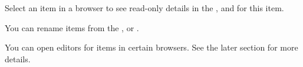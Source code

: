 Select an item in a browser to see read-only details in the \gdpropview{}, \gddatasetsview{} and \gdcompnamesview{} for this item. 

You can rename items from the \gdtestcasebrowser{}, \gdtestsuitebrowser{} or \gdcompnamebrowser{}. 

You can open editors for items in certain browsers. See the later section  for more details.
